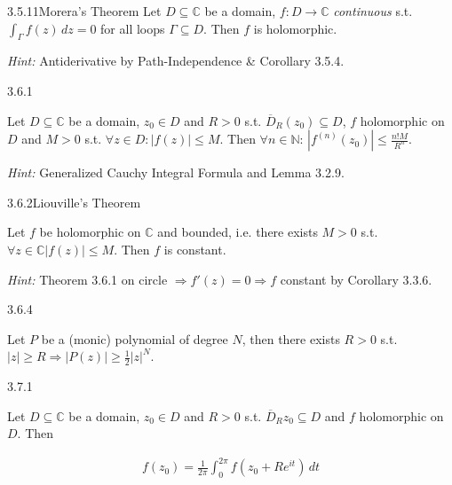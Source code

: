 \documentclass[10pt,landscape]{article}
\renewcommand{\leq}{\leqslant}
\renewcommand{\geq}{\geqslant}
\newcommand{\Hint}{\textit{Hint: }}
\begin{document}
\begin{multicols}{3}
\begin{theorem}{3.5.11}{Morera's Theorem}
    Let $D \subseteq \mathbb{C}$ be a domain, $f: D \to \mathbb{C}$ \emph{continuous} s.t. $\int_{\Gamma}f(z) \,dz = 0$ for all loops $\Gamma \subseteq D$. Then $f$ is holomorphic.


    \Hint Antiderivative by Path-Independence \& Corollary 3.5.4.

\end{theorem}

\begin{theorem}{3.6.1}{}

    Let $D \subseteq \mathbb{C}$ be a domain, $z_0 \in D$ and $R > 0$ s.t. $\overline{D}_R(z_0) \subseteq D$, $f$ holomorphic on $D$ and $M > 0$ s.t. $\forall z \in D: |f(z)| \leq M$. Then $\forall n \in \mathbb{N}$: $\displaystyle |f^{(n)}(z_0)| \leq \frac{n!M}{R^n}$.

    \Hint Generalized Cauchy Integral Formula and Lemma 3.2.9.

\end{theorem}

\begin{theorem}{3.6.2}{Liouville's Theorem}

    Let $f$ be holomorphic on $\mathbb{C}$ and bounded, i.e. there exists $M>0$ s.t. $\forall z \in \mathbb{C} |f(z)| \leq M$. Then $f$ is constant.

    \Hint Theorem 3.6.1 on circle $\Rightarrow f'(z) = 0 \Rightarrow f$ constant by Corollary 3.3.6.

\end{theorem}

\begin{exercise}{3.6.4}{}

    Let $P$ be a (monic) polynomial of degree $N$, then there exists $R > 0$ s.t. $|z| \geq R \Rightarrow |P(z)| \geq \frac{1}{2}|z|^N$.

\end{exercise}

\begin{theorem}{3.7.1}{}

    Let $D \subseteq \mathbb{C}$ be a domain, $z_0 \in D$ and $R > 0$ s.t. $\overline{D}_R{z_0} \subseteq D$ and $f$ holomorphic on $D$. Then

        \begin{align*}
            f(z_0) = \frac{1}{2\pi} \int_0^{2\pi} f(z_0 + Re^{it}) \,dt
        \end{align*}


\end{theorem}
\end{multicols}
\end{document}
